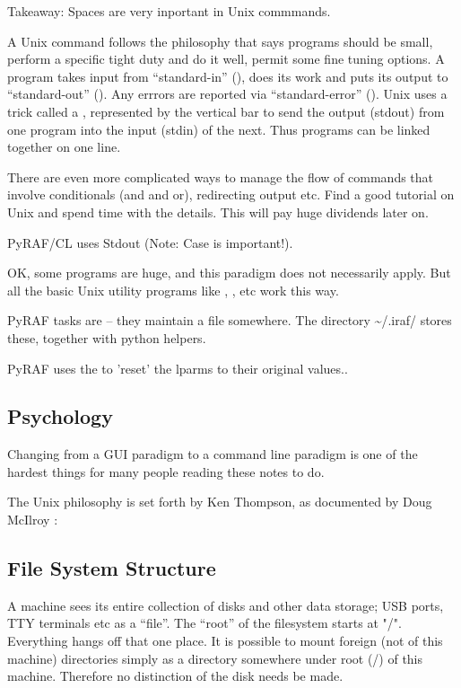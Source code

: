 Takeaway: Spaces are very inportant in Unix commmands.

A Unix command follows the philosophy that says programs should be
small, perform a specific tight duty and do it well, permit some fine
tuning options. A program takes input from ``standard-in''
(), does its work and puts its output to ``standard-out''
(). Any errrors are reported via ``standard-error''
(). Unix uses a trick called a , represented
by the vertical bar \llbox{|} to send the
output (stdout) from one program into the input (stdin) of the next.  Thus
programs can be linked together on one line. 

There are even more complicated ways to manage the flow of commands that
involve conditionals (and and or), redirecting output etc. Find a good
tutorial on Unix and spend time with the details. This will pay huge
dividends later on.

PyRAF/CL uses Stdout (Note: Case is important!). 

OK, some programs are huge, and this paradigm does not necessarily
apply. But all the basic Unix utility programs like , ,
 etc work this way.

PyRAF tasks are  -- they maintain a  file somewhere.
The directory {\textasciitilde{}/.iraf/} stores these, together
with python helpers. 

PyRAF uses the  to 'reset' the lparms to their original 
values..

\subsection*{Psychology}

Changing from a GUI paradigm to a command line paradigm is one of the
hardest things for many people reading these notes to do.

The Unix philosophy is set forth by Ken Thompson, as documented by Doug
McIlroy \cite{McIlroy1978,McIlloryPhilosophy}:

\subsection{File System Structure}

A machine sees its entire collection of disks and other data storage;
USB ports, TTY terminals etc as a ``file''. The ``root'' of the
filesystem starts at "/". Everything hangs off that one place.
It is possible to mount foreign (not of this machine) directories
simply as a directory somewhere under root (/) of this machine.
Therefore no distinction of the disk needs be made.

